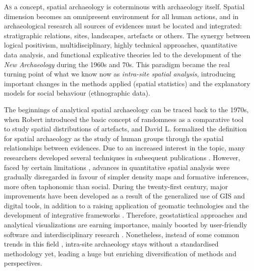 \lettrine[nindent=0em,lines=3]{A}{s} a concept, spatial archaeology is coterminous with archaeology itself. Spatial dimension becomes an omnipresent environment for all human actions, and in archaeological research all sources of evidences must be located and integrated: stratigraphic relations, sites, landscapes, artefacts or others. The synergy between logical positivism, multidisciplinary, highly technical approaches, quantitative data analysis, and functional explicative theories led to the development of the \textit{New Archaeology} during the 1960s and 70s. This paradigm became the real turning point of what we know now as \textit{intra-site spatial analysis}, introducing important changes in the methods applied (spatial statistics) and the explanatory models for social behaviour (ethnographic data). 
	
The beginnings of analytical spatial archaeology can be traced back to the 1970s, when Robert \textcite{Whallon_1973} introduced the basic concept of randomness as a comparative tool to study spatial distributions of artefacts, and David L. \textcite{Clarke_1997} formalized the definition for spatial archaeology as the study of human groups through the spatial relationships between evidences. Due to an increased interest in the topic, many researchers developed several techniques in subsequent publications \parencites[e.g.][]{Hodder_1976}{Upham_1979}{Hietala_1984}{Blankholm_1991}. However, faced by certain limitations \parencite[cf.][]{Gamble_1991}, advances in quantitative spatial analysis were gradually disregarded in favour of simpler density maps and formative inferences, more often taphonomic than social. During the twenty-first century, major improvements have been developed as a result of the generalized use of GIS and digital tools, in addition to a raising application of geomatic technologies and the development of integrative frameworks \parencites{Llobera_2011}{McCoy_2009}. Therefore, geostatistical approaches and analytical visualizations are earning importance, mainly boosted by user-friendly software and interdisciplinary research \parencites[e.g.][]{Barceló_2008}{Craig_2006}{Lloyd_2004}{Katsianis_2008}. Nonetheless, instead of some common trends in this field \parencite[see][]{Djindjian_1999}, intra-site archaeology stays without a standardised methodology yet, leading a huge but enriching diversification of methods and perspectives. 
	
